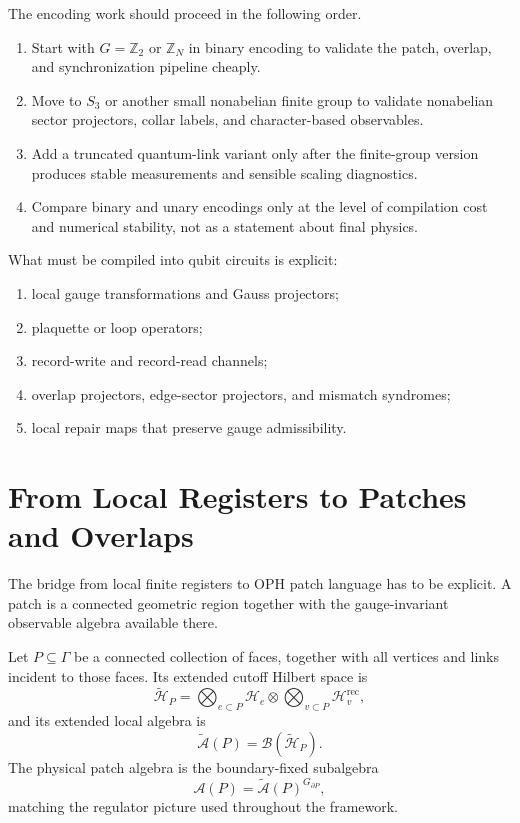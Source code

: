 \documentclass[11pt]{article}
\begin{document}
The encoding work should proceed in the following order.
\begin{enumerate}[leftmargin=2em]
\item Start with $G=\mathbb Z_2$ or $\mathbb Z_N$ in binary encoding to validate the patch,
overlap, and synchronization pipeline cheaply.
\item Move to $S_3$ or another small nonabelian finite group to validate nonabelian sector
projectors, collar labels, and character-based observables.
\item Add a truncated quantum-link variant only after the finite-group version produces stable
measurements and sensible scaling diagnostics.
\item Compare binary and unary encodings only at the level of compilation cost and numerical
stability, not as a statement about final physics.
\end{enumerate}

What must be compiled into qubit circuits is explicit:
\begin{enumerate}[leftmargin=2em]
\item local gauge transformations and Gauss projectors;
\item plaquette or loop operators;
\item record-write and record-read channels;
\item overlap projectors, edge-sector projectors, and mismatch syndromes;
\item local repair maps that preserve gauge admissibility.
\end{enumerate}

\section{From Local Registers to Patches and Overlaps}

The bridge from local finite registers to OPH patch language has to be explicit. A patch is
a connected geometric region together with the gauge-invariant observable algebra available
there.

Let $P\subseteq \Gamma$ be a connected collection of faces, together with all vertices and
links incident to those faces. Its extended cutoff Hilbert space is
\begin{equation}
\widetilde{\mathcal H}_P=
\bigotimes_{e\subset P}\mathcal H_e
\otimes
\bigotimes_{v\subset P}\mathcal H_v^{\mathrm{rec}},
\end{equation}
and its extended local algebra is
\begin{equation}
\widetilde{\mathcal A}(P)=\mathcal B(\widetilde{\mathcal H}_P).
\end{equation}
The physical patch algebra is the boundary-fixed subalgebra
\begin{equation}
\mathcal A(P)=\widetilde{\mathcal A}(P)^{G_{\partial P}},
\end{equation}
matching the regulator picture used throughout the framework.
\end{document}
